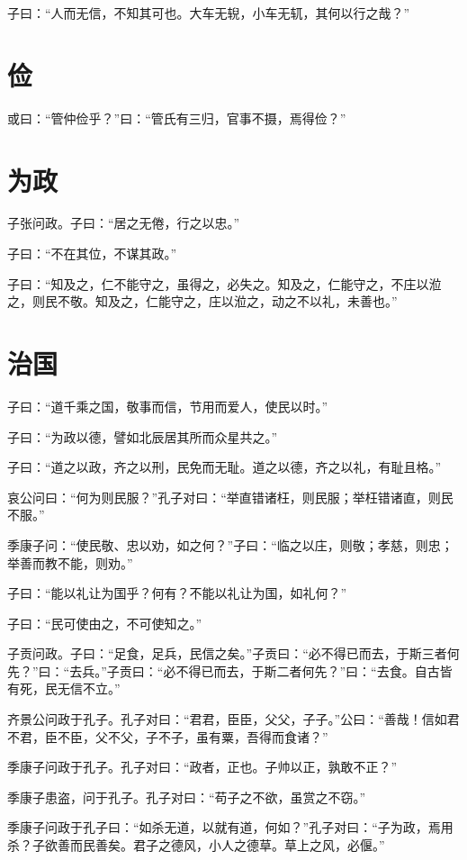 \documentclass[a5paper]{ctexbook}
\begin{document}
    子曰：“人而无信，不知其可也。大车无𫐐，小车无𫐄，其何以行之哉？”

    \chapter{俭}

    或曰：“管仲俭乎？”曰：“管氏有三归，官事不摄，焉得俭？”

    \chapter{为政}

    子张问政。子曰：“居之无倦，行之以忠。”

    子曰：“不在其位，不谋其政。”

    子曰：“知及之，仁不能守之，虽得之，必失之。知及之，仁能守之，不庄以涖之，则民不敬。知及之，仁能守之，庄以涖之，动之不以礼，未善也。”

    \chapter{治国}

    子曰：“道千乘之国，敬事而信，节用而爱人，使民以时。”

    子曰：“为政以德，譬如北辰居其所而众星共之。”

    子曰：“道之以政，齐之以刑，民免而无耻。道之以德，齐之以礼，有耻且格。”

    哀公问曰：“何为则民服？”孔子对曰：“举直错诸枉，则民服；举枉错诸直，则民不服。”

    季康子问：“使民敬、忠以劝，如之何？”子曰：“临之以庄，则敬；孝慈，则忠；举善而教不能，则劝。”

    子曰：“能以礼让为国乎？何有？不能以礼让为国，如礼何？”

    子曰：“民可使由之，不可使知之。”

    子贡问政。子曰：“足食，足兵，民信之矣。”子贡曰：“必不得已而去，于斯三者何先？”曰：“去兵。”子贡曰：“必不得已而去，于斯二者何先？”曰：“去食。自古皆有死，民无信不立。”

    齐景公问政于孔子。孔子对曰：“君君，臣臣，父父，子子。”公曰：“善哉！信如君不君，臣不臣，父不父，子不子，虽有粟，吾得而食诸？”

    季康子问政于孔子。孔子对曰：“政者，正也。子帅以正，孰敢不正？”

    季康子患盗，问于孔子。孔子对曰：“苟子之不欲，虽赏之不窃。”

    季康子问政于孔子曰：“如杀无道，以就有道，何如？”孔子对曰：“子为政，焉用杀？子欲善而民善矣。君子之德风，小人之德草。草上之风，必偃。”
\end{document}
